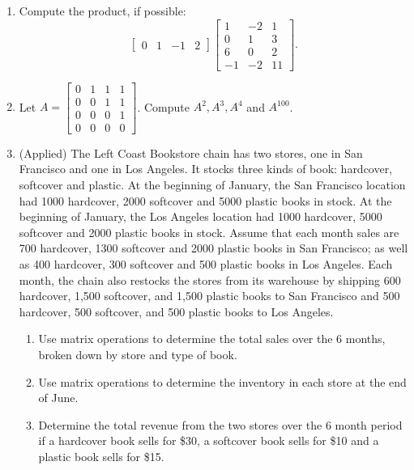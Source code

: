 \documentclass[10pt]{book}
\theoremstyle{definition}
\theoremstyle{remark}
\begin{document}
\begin{large}
\begin{enumerate}
\item Compute the product, if possible: \[ \begin{bmatrix} 0&1&-1&2 \end{bmatrix} \begin{bmatrix}1 & -2 & 1 \\ 0 & 1 & 3 \\6 & 0 & 2 \\ -1 & -2 & 11 \end{bmatrix}.\]\vfil\vfil

\item Let $A = \begin{bmatrix}0&1&1&1\\0&0&1&1\\0&0&0&1\\0&0&0&0 \end{bmatrix}$.  Compute $A^2, A^3, A^4$ and $A^{100}$.\vfil\vfil
\newpage

\item (Applied) The Left Coast Bookstore chain has two stores, one in San Francisco and one in Los Angeles. It stocks three kinds of book: hardcover, softcover and plastic. At the beginning of January, the San Francisco location had 1000 hardcover, 2000 softcover and 5000 plastic books in stock. At the beginning of January, the Los Angeles location had 1000 hardcover, 5000 softcover and 2000 plastic books in stock. Assume that each month sales are 700 hardcover, 1300 softcover and 2000 plastic books in San Francisco; as well as 400 hardcover, 300 softcover and 500 plastic books in Los Angeles. Each month, the chain also restocks the stores from its warehouse by shipping 600 hardcover, 1,500 softcover, and 1,500 plastic books to San Francisco and 500 hardcover, 500 softcover, and 500 plastic books to Los Angeles. 
\begin{enumerate}
	\item  Use matrix operations to determine the total sales over the 6 months, broken down by store and type of book.
	\item  Use matrix operations to determine the inventory in each store at the end of June. 
	\item Determine the total revenue from the two stores over the 6 month period if a hardcover book sells for \$30, a softcover book sells for \$10 and a plastic book sells for \$15. 
\end{enumerate}\vfil \vfil
\end{enumerate}
\end{large}
\newpage
\end{document}
